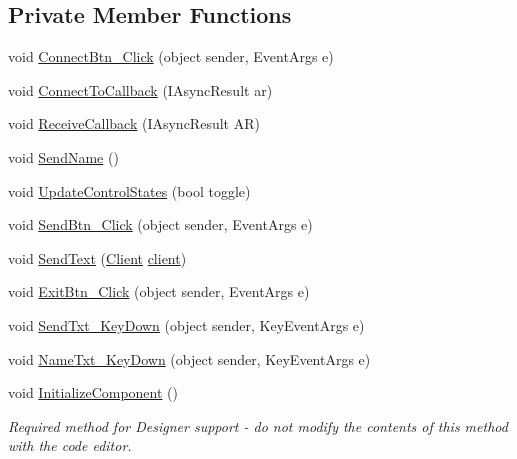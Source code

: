 \subsection*{Private Member Functions}
\begin{DoxyCompactItemize}
\item 
void \hyperlink{class_socket_client_1_1_socket_client_a11f3d8e059c5212571ffa31b341db817}{Connect\+Btn\+\_\+\+Click} (object sender, Event\+Args e)
\item 
void \hyperlink{class_socket_client_1_1_socket_client_a9f94765a98f16857de0abb270fbe9679}{Connect\+To\+Callback} (I\+Async\+Result ar)
\item 
void \hyperlink{class_socket_client_1_1_socket_client_ace38e3f7f43d32563ffb8f20cfa9ee19}{Receive\+Callback} (I\+Async\+Result AR)
\item 
void \hyperlink{class_socket_client_1_1_socket_client_aa5bdeccde8564ade04ece861218ba7f3}{Send\+Name} ()
\item 
void \hyperlink{class_socket_client_1_1_socket_client_aa3a0cd25dc845093679adab2eabcf118}{Update\+Control\+States} (bool toggle)
\item 
void \hyperlink{class_socket_client_1_1_socket_client_a9080f6ed9103d3388e3768da4276e237}{Send\+Btn\+\_\+\+Click} (object sender, Event\+Args e)
\item 
void \hyperlink{class_socket_client_1_1_socket_client_a0ffad9543c6accf3fa6a6d957b34feb9}{Send\+Text} (\hyperlink{class_socket_client_1_1_client}{Client} \hyperlink{class_socket_client_1_1_socket_client_a09a6b075aa1a2e8669cf52466e28b988}{client})
\item 
void \hyperlink{class_socket_client_1_1_socket_client_aa1542d2df54e6322e37d87724ff01391}{Exit\+Btn\+\_\+\+Click} (object sender, Event\+Args e)
\item 
void \hyperlink{class_socket_client_1_1_socket_client_a10780b5b665e5f1be462b728be91f253}{Send\+Txt\+\_\+\+Key\+Down} (object sender, Key\+Event\+Args e)
\item 
void \hyperlink{class_socket_client_1_1_socket_client_a0a1cbcdf80431b5be6a9693df1e4933b}{Name\+Txt\+\_\+\+Key\+Down} (object sender, Key\+Event\+Args e)
\item 
void \hyperlink{class_socket_client_1_1_socket_client_ae31dc82e1b1d076129b128b42886be56}{Initialize\+Component} ()
\begin{DoxyCompactList}\small\item\em Required method for Designer support -\/ do not modify the contents of this method with the code editor. \end{DoxyCompactList}\end{DoxyCompactItemize}
